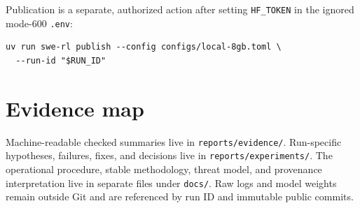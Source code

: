 \documentclass[11pt]{article}
\begin{document}
Publication is a separate, authorized action after setting \texttt{HF\_TOKEN} in the ignored mode-600 \texttt{.env}:

\begin{verbatim}
uv run swe-rl publish --config configs/local-8gb.toml \
  --run-id "$RUN_ID"
\end{verbatim}

\section{Evidence map}

Machine-readable checked summaries live in \texttt{reports/evidence/}. Run-specific hypotheses, failures, fixes, and decisions live in \texttt{reports/experiments/}. The operational procedure, stable methodology, threat model, and provenance interpretation live in separate files under \texttt{docs/}. Raw logs and model weights remain outside Git and are referenced by run ID and immutable public commits.
\end{document}
